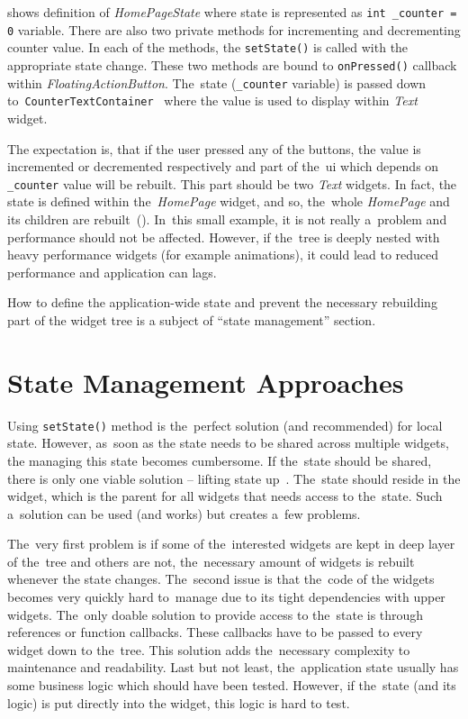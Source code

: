  shows definition of \textit{HomePageState} where state is represented as \verb|int _counter = 0| variable. There are also two private methods for incrementing and decrementing counter value. In each of the methods, the \verb|setState()| is called with the appropriate state change.  These two methods are bound to \verb|onPressed()| callback within \textit{FloatingActionButton}. The~state (\verb|_counter| variable) is passed down to~\verb|CounterTextContainer|~ where the value is used to display within \textit{Text} widget. 

The expectation is, that if the user pressed any of the buttons, the value is incremented or decremented respectively and part of the~\gls{ui} which depends on \verb|_counter| value will be rebuilt. This part should be two \textit{Text} widgets. In fact, the state is defined within the~\textit{HomePage} widget, and so, the~whole \textit{HomePage} and its children are rebuilt~(). In~this small example, it is not really a~problem and performance should not be affected. However, if the~tree is deeply nested with heavy performance widgets (for example animations), it could lead to reduced performance and application can lags. 

How to define the application-wide state and prevent the necessary rebuilding part of the widget tree is a subject of ``state management'' section.
\section{State Management Approaches}
Using \verb|setState()| method is the~perfect solution (and recommended) for local state. However, as~soon as the state needs to be shared across multiple widgets, the managing this state becomes cumbersome. If the~state should be shared, there is only one viable solution -- lifting state up~\cite{flutter-simple-state-management}. The~state should reside in the widget, which is the parent for all widgets that needs access to the~state. Such a~solution can be used (and works) but creates a~few problems. 

The~very first problem is if some of the~interested widgets are kept in deep layer of the~tree and others are not, the~necessary amount of widgets is rebuilt whenever the state changes. The~second issue is that the~code of the widgets becomes very quickly hard to~manage due to its tight dependencies with upper widgets. The~only doable solution to provide access to the~state is through references or function callbacks. These callbacks have to be passed to every widget down to the~tree. This solution adds the~necessary complexity to maintenance and readability. Last but not least, the~application state usually has some business logic which should have been tested. However, if the~state (and its logic) is put directly into the widget, this logic is hard to test. 

